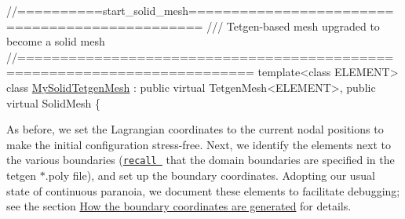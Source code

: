  
\begin{DoxyCodeInclude}
\textcolor{comment}{//==========start\_solid\_mesh===============================================}
\textcolor{comment}{/// Tetgen-based mesh upgraded to become a solid mesh}
\textcolor{comment}{}\textcolor{comment}{//=========================================================================}
\textcolor{keyword}{template}<\textcolor{keyword}{class} ELEMENT>
\textcolor{keyword}{class }\hyperlink{classMySolidTetgenMesh}{MySolidTetgenMesh} : \textcolor{keyword}{public} \textcolor{keyword}{virtual} TetgenMesh<ELEMENT>, 
                       \textcolor{keyword}{public} \textcolor{keyword}{virtual} SolidMesh 
\{

\end{DoxyCodeInclude}


As before, we set the Lagrangian coordinates to the current nodal positions to make the initial configuration stress-\/free. Next, we identify the elements next to the various boundaries (\href{../../../solid/unstructured_three_d_solid/html/index.html}{\tt recall } that the domain boundaries are specified in the tetgen {\ttfamily $\ast$.poly} file), and set up the boundary coordinates. Adopting our usual state of continuous paranoia, we document these elements to facilitate debugging; see the section \hyperlink{index_boundary_coord}{How the boundary coordinates are generated} for details.


